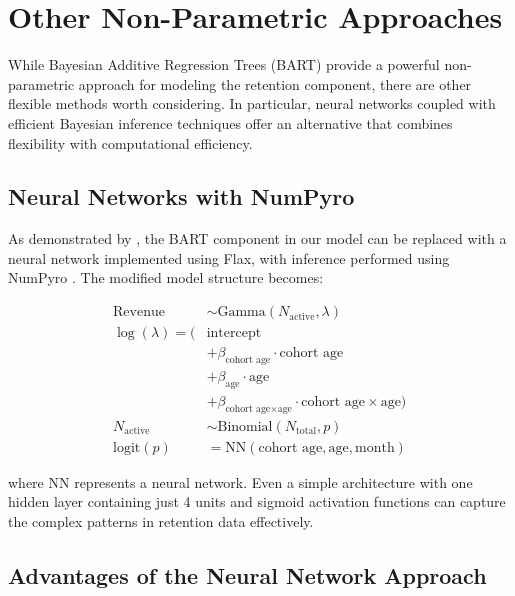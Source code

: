 \documentclass[11pt]{amsart}
\theoremstyle{definition}
\begin{document}
\section{Other Non-Parametric Approaches}

While Bayesian Additive Regression Trees (BART) provide a powerful non-parametric approach for modeling the retention
component, there are other flexible methods worth considering. In particular, neural networks coupled with efficient
Bayesian inference techniques offer an alternative that combines flexibility with computational efficiency.

\subsection{Neural Networks with NumPyro}

As demonstrated by \cite{orduz_revenue_retention_numpyro}, the BART component in our model can be replaced with a neural
network implemented using Flax, with inference performed using NumPyro \cite{phan2019composable}. The modified model
structure becomes:

\begin{align*}
    \text{Revenue}    & \sim \text{Gamma}(N_{\text{active}}, \lambda)                                            \\
    \log(\lambda) = ( & \text{intercept}                                                                         \\
                      & + \beta_{\text{cohort age}} \cdot \text{cohort age}                                      \\
                      & + \beta_{\text{age}} \cdot \text{age}                                                    \\
                      & + \beta_{\text{cohort age} \times \text{age}} \cdot \text{cohort age} \times \text{age}) \\
    N_{\text{active}} & \sim \text{Binomial}(N_{\text{total}}, p)                                                \\
    \textrm{logit}(p) & = \text{NN}(\text{cohort age}, \text{age}, \text{month})
\end{align*}

where $\text{NN}$ represents a neural network. Even a simple architecture with one hidden layer containing just 4 units and
sigmoid activation functions can capture the complex patterns in retention data effectively.

\subsection{Advantages of the Neural Network Approach}
\end{document}
